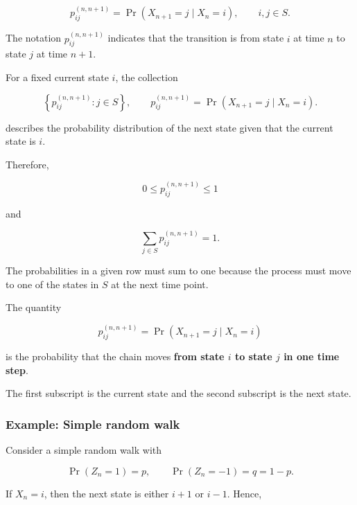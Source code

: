 \documentclass[
  letterpaper,
  DIV=11,
  numbers=noendperiod]{scrartcl}
\theoremstyle{definition}
\theoremstyle{remark}
\begin{document}
\[
p_{ij}^{(n,n+1)}
=\Pr(X_{n+1}=j\mid X_n=i),
\qquad i,j\in S.
\]

The notation \(p_{ij}^{(n,n+1)}\) indicates that the transition is from
state \(i\) at time \(n\) to state \(j\) at time \(n+1\).

For a fixed current state \(i\), the collection

\[
\left\{p_{ij}^{(n,n+1)}:j\in S\right\},
\qquad
p_{ij}^{(n,n+1)}
=
\Pr(X_{n+1}=j\mid X_n=i).
\]

describes the probability distribution of the next state given that the
current state is \(i\).

Therefore,

\[
0\leq p_{ij}^{(n,n+1)}\leq 1
\]

and

\[
\sum_{j\in S}p_{ij}^{(n,n+1)}=1.
\]

The probabilities in a given row must sum to one because the process
must move to one of the states in \(S\) at the next time point.

\begin{tcolorbox}[enhanced jigsaw, arc=.35mm, bottomrule=.15mm, bottomtitle=1mm, breakable, colback=white, colbacktitle=quarto-callout-note-color!10!white, colframe=quarto-callout-note-color-frame, coltitle=black, left=2mm, leftrule=.75mm, opacityback=0, opacitybacktitle=0.6, rightrule=.15mm, title=\textcolor{quarto-callout-note-color}{\faInfo}\hspace{0.5em}{Interpreting a transition probability}, titlerule=0mm, toprule=.15mm, toptitle=1mm]

The quantity

\[
p_{ij}^{(n,n+1)}
=\Pr(X_{n+1}=j\mid X_n=i)
\]

is the probability that the chain moves \textbf{from state \(i\) to
state \(j\) in one time step}.

The first subscript is the current state and the second subscript is the
next state.

\end{tcolorbox}

\subsubsection{Example: Simple random
walk}\label{example-simple-random-walk}

Consider a simple random walk with

\[
\Pr(Z_n=1)=p,
\qquad
\Pr(Z_n=-1)=q=1-p.
\]

If \(X_n=i\), then the next state is either \(i+1\) or \(i-1\). Hence,
\end{document}
